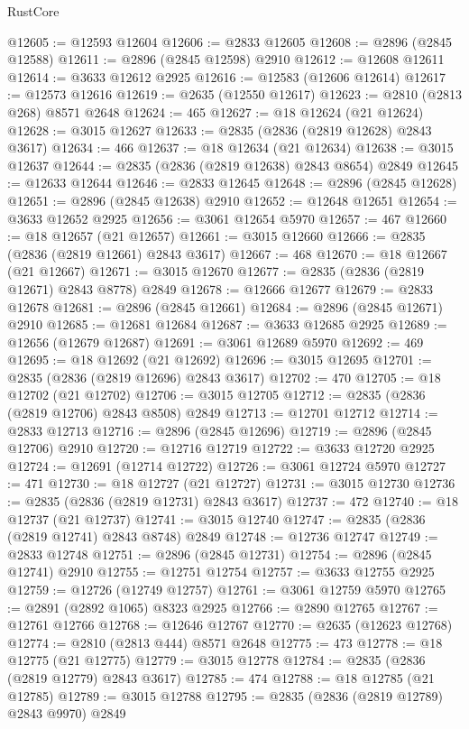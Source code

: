 \begin{lexlean}{RustCore}
\begin{coremodule}
@12605 := @12593 @12604
@12606 := @2833 @12605
@12608 := @2896 (@2845 @12588)
@12611 := @2896 (@2845 @12598) @2910
@12612 := @12608 @12611
@12614 := @3633 @12612 @2925
@12616 := @12583 (@12606 @12614)
@12617 := @12573 @12616
@12619 := @2635 (@12550 @12617)
@12623 := @2810 (@2813 @268) @8571 @2648
@12624 := 465
@12627 := @18 @12624 (@21 @12624)
@12628 := @3015 @12627
@12633 := @2835 (@2836 (@2819 @12628) @2843 @3617)
@12634 := 466
@12637 := @18 @12634 (@21 @12634)
@12638 := @3015 @12637
@12644 := @2835 (@2836 (@2819 @12638) @2843 @8654) @2849
@12645 := @12633 @12644
@12646 := @2833 @12645
@12648 := @2896 (@2845 @12628)
@12651 := @2896 (@2845 @12638) @2910
@12652 := @12648 @12651
@12654 := @3633 @12652 @2925
@12656 := @3061 @12654 @5970
@12657 := 467
@12660 := @18 @12657 (@21 @12657)
@12661 := @3015 @12660
@12666 := @2835 (@2836 (@2819 @12661) @2843 @3617)
@12667 := 468
@12670 := @18 @12667 (@21 @12667)
@12671 := @3015 @12670
@12677 := @2835 (@2836 (@2819 @12671) @2843 @8778) @2849
@12678 := @12666 @12677
@12679 := @2833 @12678
@12681 := @2896 (@2845 @12661)
@12684 := @2896 (@2845 @12671) @2910
@12685 := @12681 @12684
@12687 := @3633 @12685 @2925
@12689 := @12656 (@12679 @12687)
@12691 := @3061 @12689 @5970
@12692 := 469
@12695 := @18 @12692 (@21 @12692)
@12696 := @3015 @12695
@12701 := @2835 (@2836 (@2819 @12696) @2843 @3617)
@12702 := 470
@12705 := @18 @12702 (@21 @12702)
@12706 := @3015 @12705
@12712 := @2835 (@2836 (@2819 @12706) @2843 @8508) @2849
@12713 := @12701 @12712
@12714 := @2833 @12713
@12716 := @2896 (@2845 @12696)
@12719 := @2896 (@2845 @12706) @2910
@12720 := @12716 @12719
@12722 := @3633 @12720 @2925
@12724 := @12691 (@12714 @12722)
@12726 := @3061 @12724 @5970
@12727 := 471
@12730 := @18 @12727 (@21 @12727)
@12731 := @3015 @12730
@12736 := @2835 (@2836 (@2819 @12731) @2843 @3617)
@12737 := 472
@12740 := @18 @12737 (@21 @12737)
@12741 := @3015 @12740
@12747 := @2835 (@2836 (@2819 @12741) @2843 @8748) @2849
@12748 := @12736 @12747
@12749 := @2833 @12748
@12751 := @2896 (@2845 @12731)
@12754 := @2896 (@2845 @12741) @2910
@12755 := @12751 @12754
@12757 := @3633 @12755 @2925
@12759 := @12726 (@12749 @12757)
@12761 := @3061 @12759 @5970
@12765 := @2891 (@2892 @1065) @8323 @2925
@12766 := @2890 @12765
@12767 := @12761 @12766
@12768 := @12646 @12767
@12770 := @2635 (@12623 @12768)
@12774 := @2810 (@2813 @444) @8571 @2648
@12775 := 473
@12778 := @18 @12775 (@21 @12775)
@12779 := @3015 @12778
@12784 := @2835 (@2836 (@2819 @12779) @2843 @3617)
@12785 := 474
@12788 := @18 @12785 (@21 @12785)
@12789 := @3015 @12788
@12795 := @2835 (@2836 (@2819 @12789) @2843 @9970) @2849

\end{coremodule}
\end{lexlean}
